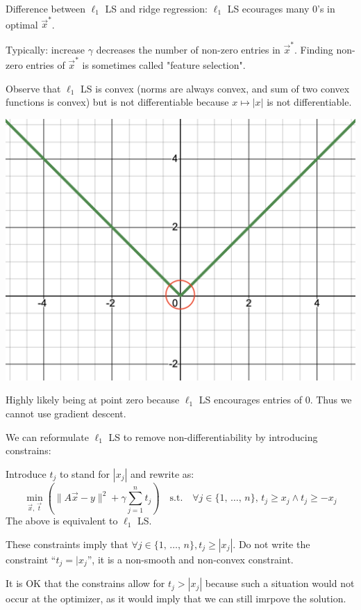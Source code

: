 \documentclass{article}
\begin{document}
Difference between $\ell_1$ LS and ridge regression: $\ell_1$ LS ecourages many $0$'s in optimal $\vec{x}^*$.

Typically: increase $\gamma$ decreases the number of non-zero entries in $\vec{x}^*$. Finding non-zero entries of $\vec{x}^*$ is sometimes called "feature selection".

Observe that $\ell_1$ LS is convex (norms are always convex, and sum of two convex functions is convex) but is not differentiable because $x \mapsto |x|$ is not differentiable.

\begin{center}
    \includegraphics*[scale=0.4]{abs_x.png}
\end{center}

Highly likely being at point zero because $\ell_1$ LS encourages entries of $0$. Thus we cannot use gradient descent.

We can reformulate $\ell_1$ LS to remove non-differentiability by introducing constrains:

Introduce $t_j$ to stand for $|x_j|$ and rewrite as:
\[
    \min_{\vec{x},\, \vec{t}}\left(\|A\vec{x} - y\|^2 + \gamma\sum_{j = 1}^n t_j\right) \quad \text{s.t.} \quad \forall j \in \{1,\, \ldots,\, n\},\, t_j \geq x_j \wedge t_j \geq -x_j \tag{$\ell_1$ LS-$2$}
\]
The above is equivalent to $\ell_1$ LS.

These constraints imply that $\forall j \in \{1,\, \ldots,\, n\}, t_j \geq |x_j|$. Do not write the constraint ``$t_j = |x_j$'', it is a non-smooth and non-convex constraint.

It is OK that the constrains allow for $t_j > |x_j|$ because such a situation would not occur at the optimizer, as it would imply that we can still imrpove the solution.
\end{document}
